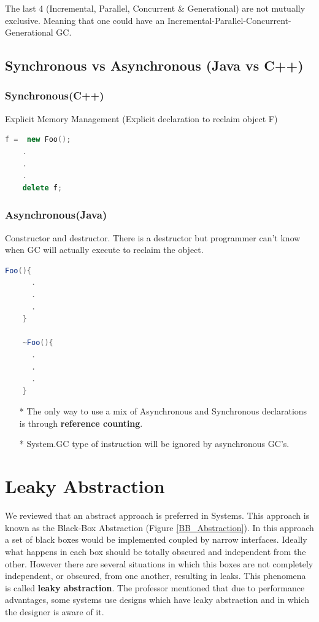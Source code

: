 \documentclass[twoside]{article}
\begin{document}
The last 4 (Incremental, Parallel, Concurrent \& Generational) are not mutually exclusive. Meaning that one could have an Incremental-Parallel-Concurrent-Generational GC.

\subsection{Synchronous vs Asynchronous (Java vs C++)}

\begin{multicols}{2}

\subsubsection*{Synchronous(C++)}
Explicit Memory Management (Explicit declaration to reclaim object F)
\begin{lstlisting}[language=C++]
	f =  new Foo();
	.
	.
	.
	delete f;
\end{lstlisting}
\columnbreak

\subsubsection*{Asynchronous(Java)}
Constructor and destructor. There is a destructor but programmer can't know when GC will actually execute to reclaim the object.
\begin{lstlisting}[language=Java]
	Foo(){
	  .
	  .
	  .
	}

	~Foo(){
	  .
	  .
	  .
	}
\end{lstlisting}

\end{multicols}

\begin{enumerate}
	\item[*] The only way to use a mix of Asynchronous and Synchronous declarations is through \textbf{reference counting}.
	\item[*] System.GC type of instruction will be ignored by asynchronous GC's.
\end{enumerate}

\section{Leaky Abstraction}

We reviewed that an abstract approach is preferred in Systems. This approach is known as the Black-Box Abstraction  (Figure \ref{BB_Abstraction}). In this approach a set of black boxes would be implemented coupled by narrow interfaces. Ideally what happens in each box should be totally obscured and independent from the other. However there are several situations in which this boxes are not completely independent, or obscured, from one another, resulting in leaks. This phenomena is called \textbf{leaky abstraction}. The professor mentioned that due to performance advantages, some systems use designs which have leaky abstraction and in which the designer is aware of it. 
\end{document}
